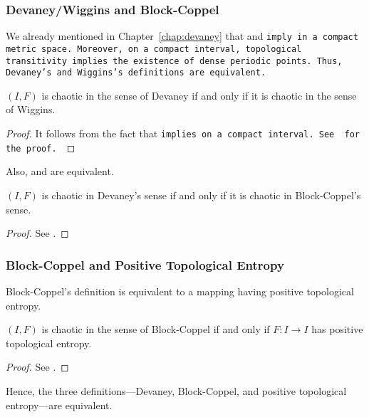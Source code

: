 \documentclass[10pt,twoside,draft]{book}
\begin{document}
\subsubsection*{Devaney/Wiggins and Block-Coppel}
We already mentioned in Chapter~\ref{chap:devaney} that \dpp and \tt imply \sdic in a compact metric space.
Moreover, on a compact interval, topological transitivity implies the existence of dense periodic points.
Thus, Devaney's and Wiggins's definitions are equivalent.
\begin{theorem}
  $(I,F)$ is chaotic in the sense of Devaney if and only if it is chaotic in the sense of Wiggins.
  \label{thm:devaney-wiggins}
  \begin{proof}
    It follows from the fact that \tt implies \dpp on a compact interval.
    See \citet{silverman} for the proof.
  \end{proof}
\end{theorem}
Also, \dev and \blcp are equivalent.
\begin{theorem}
  $(I,F)$ is chaotic in Devaney's sense if and only if it is chaotic in Block-Coppel's sense.
  \begin{proof}
    See \citet{aulbach}.
  \end{proof}
  \label{thm:devaney-blockcoppel}
\end{theorem}

\subsubsection*{Block-Coppel and Positive Topological Entropy}
Block-Coppel's definition is equivalent to a mapping having positive topological entropy.
\begin{theorem}
  $(I,F)$ is chaotic in the sense of Block-Coppel if and only if $F: I \to I$ has positive topological entropy.
  \label{thm:entropy-blockcoppel}
  \begin{proof}
    See \citet[VII, Theorem 24]{blockcoppel}.
  \end{proof}
\end{theorem}
Hence, the three definitions---Devaney, Block-Coppel, and positive topological entropy---are equivalent.
\end{document}
